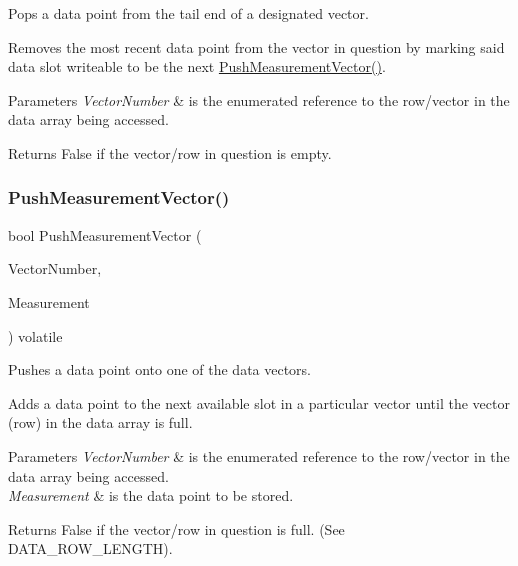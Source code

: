 Pops a data point from the tail end of a designated vector. 

Removes the most recent data point from the vector in question by marking said data slot writeable to be the next \mbox{\hyperlink{class_master_ac907bfa48b84098a906c63c933cc373d}{Push\+Measurement\+Vector()}}. 
\begin{DoxyParams}{Parameters}
{\em Vector\+Number} & is the enumerated reference to the row/vector in the data array being accessed. \\
\hline
\end{DoxyParams}
\begin{DoxyReturn}{Returns}
False if the vector/row in question is empty. 
\end{DoxyReturn}
\mbox{\label{class_master_ac907bfa48b84098a906c63c933cc373d}} 
\subsubsection{\texorpdfstring{PushMeasurementVector()}{PushMeasurementVector()}}
{\footnotesize\ttfamily bool Push\+Measurement\+Vector (\begin{DoxyParamCaption}\item[{const \mbox{\hyperlink{_s_p_i___instruction_set_8h_a9d8048399836e11887f85cc8dc3d75d5}{Measurement\+Vectors}}}]{Vector\+Number,  }\item[{const float}]{Measurement }\end{DoxyParamCaption}) volatile}



Pushes a data point onto one of the data vectors. 

Adds a data point to the next available slot in a particular vector until the vector (row) in the data array is full. 
\begin{DoxyParams}{Parameters}
{\em Vector\+Number} & is the enumerated reference to the row/vector in the data array being accessed. \\
\hline
{\em Measurement} & is the data point to be stored. \\
\hline
\end{DoxyParams}
\begin{DoxyReturn}{Returns}
False if the vector/row in question is full. (See D\+A\+T\+A\+\_\+\+R\+O\+W\+\_\+\+L\+E\+N\+G\+TH). 
\end{DoxyReturn}
\mbox{\label{class_master_a8a9c9670d31af14e65157879963e0cf1}} 
